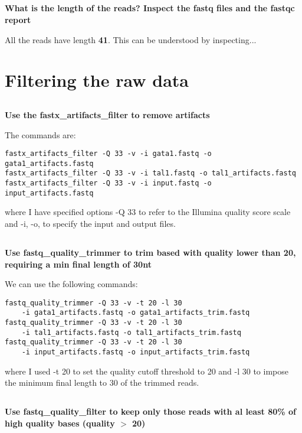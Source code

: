 \documentclass[12pt, a4paper]{article}
\begin{document}
\subsection{}
\textbf{What is the length of the reads? Inspect the fastq files and the fastqc report}

All the reads have length \textbf{41}. This can be understood by inspecting...

\section{Filtering the raw data}

\subsection{}
\textbf{Use the fastx\_artifacts\_filter to remove artifacts}

The commands are:

\begin{verbatim}
fastx_artifacts_filter -Q 33 -v -i gata1.fastq -o gata1_artifacts.fastq
fastx_artifacts_filter -Q 33 -v -i tal1.fastq -o tal1_artifacts.fastq
fastx_artifacts_filter -Q 33 -v -i input.fastq -o input_artifacts.fastq
\end{verbatim}

where I have specified options -Q 33 to refer to the Illumina quality score scale and -i, -o, to specify the input and output files.

\subsection{}
\textbf{Use fastq\_quality\_trimmer to trim based with quality lower than 20, requiring a min final length of 30nt}

We can use the following commands:

\begin{verbatim}
fastq_quality_trimmer -Q 33 -v -t 20 -l 30
    -i gata1_artifacts.fastq -o gata1_artifacts_trim.fastq
fastq_quality_trimmer -Q 33 -v -t 20 -l 30
    -i tal1_artifacts.fastq -o tal1_artifacts_trim.fastq
fastq_quality_trimmer -Q 33 -v -t 20 -l 30
    -i input_artifacts.fastq -o input_artifacts_trim.fastq	
\end{verbatim}

where I used -t 20 to set the quality cutoff threshold to 20 and -l 30 to impose the minimum final length to 30 of the trimmed reads.

\subsection{}
\textbf{Use fastq\_quality\_filter to keep only those reads with al least 80\% of high quality bases (quality $>$ 20)}
\end{document}
